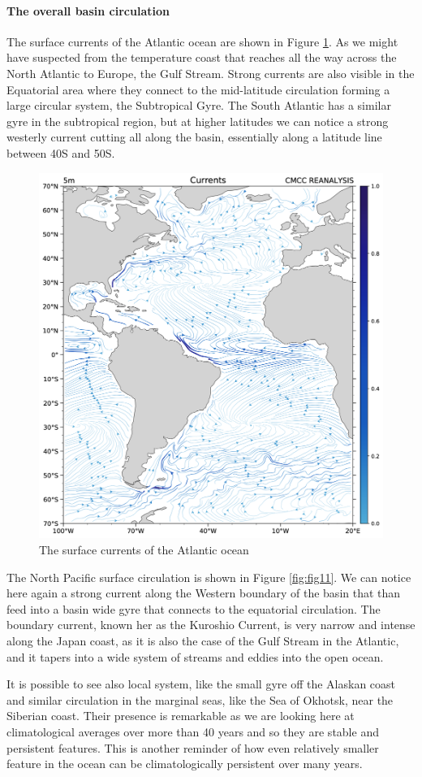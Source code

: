 \paragraph{The overall basin
	circulation}\label{the-overall-basin-circulation}

The surface currents of the Atlantic ocean are shown in Figure \ref{fig:fig10}. As we might have suspected from the temperature coast that reaches all the way across the North Atlantic to Europe, the Gulf Stream. Strong currents are also visible in the Equatorial area
where they connect to the mid-latitude circulation forming a large circular system, the Subtropical Gyre. The South Atlantic has a similar gyre in the subtropical region, but at higher latitudes we can notice a strong westerly current cutting all along the basin, essentially along a latitude line between 40S and 50S.

\begin{figure}[htpb]
	\centering
	\includegraphics[width = 0.4 \textwidth]{upload/35image.png}
	\caption{The surface currents of the Atlantic ocean} \label{fig:fig10}
\end{figure}

The North Pacific surface circulation is shown in Figure \ref{fig:fig11}. We can notice here again a strong current along the Western boundary of the basin that than feed into a basin wide gyre that connects to the equatorial circulation. The boundary current, known her as the Kuroshio Current, is very narrow and intense along the Japan coast, as it is also the case of the Gulf Stream in the Atlantic, and it tapers into a wide system of streams and eddies into the open ocean.

It is possible to see also local system, like the small gyre off the Alaskan coast and similar circulation in the marginal seas, like the Sea of Okhotsk, near the Siberian coast. Their presence is remarkable as we are looking here at climatological averages over more than 40 years and so they are stable and persistent features. This is another reminder of how even relatively smaller feature in the ocean can be climatologically persistent over many years.

